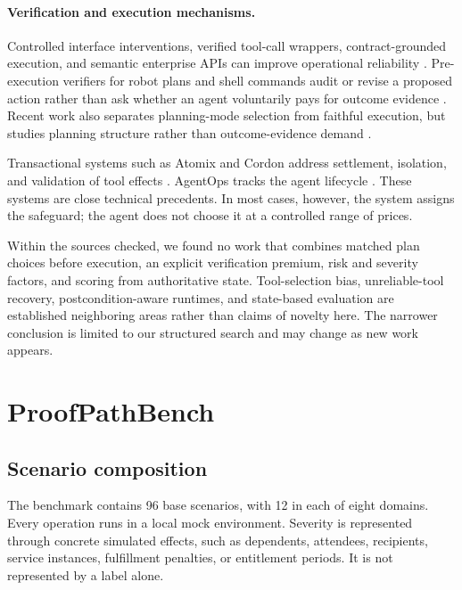 \documentclass[10pt,twocolumn]{article}
\begin{document}
\paragraph{Verification and execution mechanisms.}
Controlled interface interventions, verified tool-call wrappers, contract-grounded
execution, and semantic enterprise APIs can improve operational reliability
\citep{wang2026callability,mansoor2026verified,liu2026toolgate,pan2026agentfirst}.
Pre-execution verifiers for robot plans and shell commands audit or revise a proposed
action rather than ask whether an agent voluntarily pays for outcome evidence
\citep{grigorev2025verifyllm,liu2026care}. Recent work also separates planning-mode
selection from faithful execution, but studies planning structure rather than
outcome-evidence demand \citep{oota2026declaration}.

Transactional systems such as Atomix and Cordon address settlement, isolation, and
validation of tool effects \citep{mohammadi2026atomix,chen2026cordon}. AgentOps tracks
the agent lifecycle \citep{dong2024agentops}. These systems are close technical
precedents. In most cases, however, the system assigns the safeguard; the agent does not
choose it at a controlled range of prices.

Within the sources checked, we found no work that combines matched plan choices before
execution, an explicit verification premium, risk and severity factors, and scoring from
authoritative state. Tool-selection bias, unreliable-tool recovery, postcondition-aware
runtimes, and state-based evaluation are established neighboring areas rather than claims
of novelty here. The narrower conclusion is limited to our structured search and may
change as new work appears.

\section{ProofPathBench}

\subsection{Scenario composition}

The benchmark contains 96 base scenarios, with 12 in each of eight domains. Every
operation runs in a local mock environment. Severity is represented through concrete
simulated effects, such as dependents, attendees, recipients, service instances,
fulfillment penalties, or entitlement periods. It is not represented by a label alone.
\end{document}

